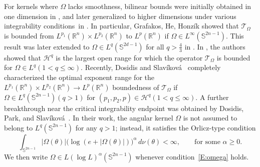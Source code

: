 \documentclass[11pt]{amsart}
\begin{document}
For kernels where $\Omega$ lacks smoothness, bilinear bounds were initially obtained in one dimension in \cite{diestel2011method}, and later generalized to higher dimensions under various integrability conditions~in \cite{grafakos2018rough, grafakos2020l2, he2023improved}. In particular, Grafakos, He, Honz\'ik \cite{grafakos2018rough} 
showed that $\mathcal {T}_\Omega$ is bounded from  $L^{p_1}(\mathbb{R}^n) \times L^{p_2}(\mathbb{R}^n) $ to $ L^p(\mathbb{R}^n)$ if $\Omega\in L^\infty(\mathbb{S}^{2n-1})$. This result was later extended to $\Omega\in L^q(\mathbb{S}^{2d-1})$ for all $q>\frac{4}{3}$ in \cite{grafakos2020l2}.
In \cite{GHS2019}, the authors showed that $\mathcal{H}^q$ is the largest open range for which the operator $\mathcal {T}_\Omega$ is bounded for $\Omega\in L^q (1<q\leq\infty)$.
Recently, Dosidis and Slavíková~\cite{dosidis2024multilinear} completely characterized the optimal exponent range for the $L^{p_1}(\mathbb{R}^n) \times L^{p_2}(\mathbb{R}^n) \to L^p(\mathbb{R}^n)$  boundedness of $\mathcal {T}_\Omega$ if $\Omega \in L^q(\mathbb{S}^{2n-1})(q>1)$ for $(p_1,p_2,p)\in\mathcal{H}^q(1<q\le \infty)$.
A further breakthrough near the critical integrability endpoint was obtained by Dosidis, Park, and Slavíková~\cite{dosidis2026bilinear}. In their work, the angular kernel $\Omega$ is not assumed to belong to $L^q(\mathbb{S}^{2n-1})$ for any $q>1$; instead, it satisfies the Orlicz-type condition
\begin{equation}\label{E:omega}
\int_{\mathbb{S}^{2n-1}} |\Omega(\theta)| \bigl(\log(e + |\Omega(\theta)|)\bigr)^\alpha \, d\nu(\theta) < \infty, \qquad \text{for some } \alpha \ge 0.
\end{equation}
We then write $\Omega \in L(\log L)^\alpha(\mathbb{S}^{2n-1})$ whenever condition~\eqref{E:omega} holds. 
\end{document}
